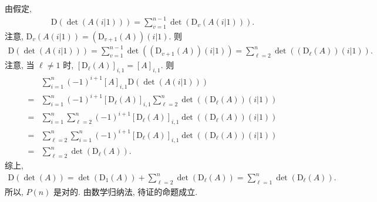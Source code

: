 \documentclass[../libro.tex]{subfiles}
\begin{document}
\begin{example}
    由假定,
    \begin{align*}
        \mathrm{D} (\det {(A(i|1))}) =
        \sum_{v = 1}^{n-1} {\det {(\mathrm{D}_v (A(i|1)))}}.
    \end{align*}
    注意, \(\mathrm{D}_v (A(i|1))
    = (\mathrm{D}_{v+1} (A)) (i|1)\).
    则
    \begin{align*}
        \mathrm{D} (\det {(A(i|1))})
        =
        \sum_{v = 1}^{n-1} {\det {((\mathrm{D}_{v+1} (A)) (i|1))}}
        =
        \sum_{\ell = 2}^{n} {\det {((\mathrm{D}_\ell (A)) (i|1))}}.
    \end{align*}
    注意, 当 \(\ell \neq 1\) 时,
    \([\mathrm{D}_\ell (A)]_{i,1} = [A]_{i,1}\).
    则
    \begin{align*}
        &
        \sum_{i = 1}^{n} {(-1)^{i+1}
        [A]_{i,1} \mathrm{D} (\det {(A(i|1))})}
        \\
        = {} &
        \sum_{i = 1}^{n} {(-1)^{i+1}
            [\mathrm{D}_\ell (A)]_{i,1}
            \sum_{\ell = 2}^{n} {\det {((\mathrm{D}_\ell (A)) (i|1))}}
        }
        \\
        = {} &
        \sum_{i = 1}^{n} {
            \sum_{\ell = 2}^{n} {
                (-1)^{i+1} [\mathrm{D}_\ell (A)]_{i,1}
                \det {((\mathrm{D}_\ell (A)) (i|1))}
            }
        }
        \\
        = {} &
        \sum_{\ell = 2}^{n} {
            \sum_{i = 1}^{n} {
                (-1)^{i+1} [\mathrm{D}_\ell (A)]_{i,1}
                \det {((\mathrm{D}_\ell (A)) (i|1))}
            }
        }
        \\
        = {} &
        \sum_{\ell = 2}^{n} {\det {(\mathrm{D}_\ell (A))}}.
    \end{align*}
    综上,
    \begin{align*}
        \mathrm{D} (\det {(A)})
        = \det {(\mathrm{D}_1 (A))}
        + \sum_{\ell = 2}^{n} {\det {(\mathrm{D}_\ell (A))}}
        = \sum_{\ell = 1}^{n} {\det {(\mathrm{D}_\ell (A))}}.
    \end{align*}
    所以, \(P(n)\) 是对的.
    由数学归纳法, 待证的命题成立.


\end{example}
\end{document}
